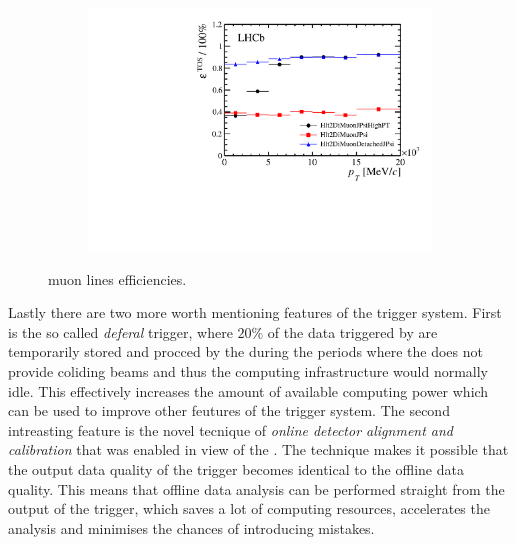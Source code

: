 \begin{figure}[t]
\begin{subfigure}{0.5\textwidth}
    \caption{}
    \label{run_one_hlt1_muon_line_eff}
  \end{subfigure}
  \begin{subfigure}{0.5\textwidth}
    \raggedleft
    \includegraphics[width=\textwidth,trim=0.45cm 0cm 0.4cm 0cm, clip=true]{Figures/Chapter2/hlt2_muon_eff}
    \caption{}
    \label{run_one_hlt2_muon_line_eff}
  \end{subfigure}
  \caption{\runone muon lines efficiencies.}
  \label{run_one_muon_line_eff}
\end{figure}



Lastly there are two more worth mentioning features of the \lhcb trigger system. First is the so called
{\it deferal} trigger, where $20\%$ of the data triggered by \lzero are temporarily stored and procced by the \hltone
during the periods where the \lhc does not provide coliding beams and thus the \lhcb computing infrastructure
would normally idle. This effectively increases the amount of available computing power which can be used
to improve other feutures of the trigger system. The second intreasting feature is the novel tecnique of
{\it online detector alignment and calibration} that was enabled in view of the \runtwo. The technique
makes it possible that the output data quality of the trigger becomes identical to the offline data quality.
This means that offline data analysis can be performed straight from the output of the trigger, which saves
a lot of computing resources, accelerates the analysis and minimises the chances of introducing mistakes.
